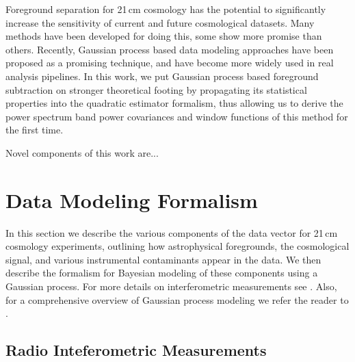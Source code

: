 \documentclass[a4paper,fleqn,usenatbib]{mnras}
\begin{document}
Foreground separation for 21\,cm cosmology has the potential to significantly increase the sensitivity of current and future cosmological datasets.
Many methods have been developed for doing this, some show more promise than others.
Recently, Gaussian process based data modeling approaches have been proposed as a promising technique, and have become more widely used in real analysis pipelines.
In this work, we put Gaussian process based foreground subtraction on stronger theoretical footing by propagating its statistical properties into the quadratic estimator formalism, thus allowing us to derive the power spectrum band power covariances and window functions of this method for the first time.

Novel components of this work are...


\section{Data Modeling Formalism}
\label{sec:formalism}

In this section we describe the various components of the data vector for 21\,cm cosmology experiments, outlining how astrophysical foregrounds, the cosmological signal, and various instrumental contaminants appear in the data.
We then describe the formalism for Bayesian modeling of these components using a Gaussian process.
For more details on interferometric measurements see \citet{Hamaker1996, Smirnov2011}.
Also, for a comprehensive overview of Gaussian process modeling we refer the reader to \citet{Rasmussen2006}.


\subsection{Radio Inteferometric Measurements}
\label{sec:rime}
\end{document}

